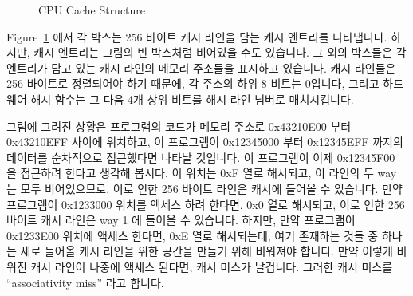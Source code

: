 \begin{figure}[t]
\begin{picture}
\end{picture}
\caption{CPU Cache Structure}
\label{fig:app:whymb:CPU Cache Structure}
\end{figure}

Figure~\ref{fig:app:whymb:CPU Cache Structure} 에서 각 박스는 256 바이트 캐시
라인을 담는 캐시 엔트리를 나타냅니다.
하지만, 캐시 엔트리는 그림의 빈 박스처럼 비어있을 수도 있습니다.
그 외의 박스들은 각 엔트리가 담고 있는 캐시 라인의 메모리 주소들을 표시하고
있습니다.
캐시 라인들은 256 바이트로 정렬되어야 하기 때문에, 각 주소의 하위 8 비트는
0입니다, 그리고 하드웨어 해시 함수는 그 다음 4개 상위 비트를 해시 라인 넘버로
매치시킵니다.

그림에 그려진 상황은 프로그램의 코드가 메모리 주소로 0x43210E00 부터 0x43210EFF
사이에 위치하고, 이 프로그램이 0x12345000 부터 0x12345EFF 까지의 데이터를
순차적으로 접근했다면 나타날 것입니다.
이 프로그램이 이제 0x12345F00 을 접근하려 한다고 생각해 봅시다.
이 위치는 0xF 열로 해시되고, 이 라인의 두 way 는 모두 비어있으므로, 이로 인한
256 바이트 라인은 캐시에 들어올 수 있습니다.
만약 프로그램이 0x1233000 위치를 액세스 하려 한다면, 0x0 열로 해시되고, 이로
인한 256 바이트 캐시 라인은 way 1 에 들어올 수 있습니다.
하지만, 만약 프로그램이 0x1233E00 위치에 액세스 한다면, 0xE 열로 해시되는데,
여기 존재하는 것들 중 하나는 새로 들어올 캐시 라인을 위한 공간을 만들기 위해
비워져야 합니다.
만약 이렇게 비워진 캐시 라인이 나중에 액세스 된다면, 캐시 미스가 날겁니다.
그러한 캐시 미스를 ``associativity miss'' 라고 합니다.

